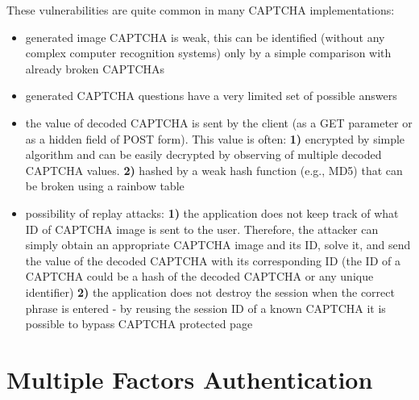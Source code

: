 	These vulnerabilities are quite common in many CAPTCHA implementations:
	\begin{itemize}
		\item generated image CAPTCHA is weak, this can be identified (without any complex computer
		recognition systems) only by a simple comparison with already broken CAPTCHAs
		\item generated CAPTCHA questions have a very limited set of possible answers
		\item the value of decoded CAPTCHA is sent by the client (as a GET parameter or as a 
		hidden field of POST form). This value is often: {\bf 1)} encrypted by simple algorithm and 
		can be easily decrypted by observing of multiple decoded CAPTCHA values. 
		{\bf 2)} hashed by a weak hash function (e.g., MD5) that can be broken using a rainbow 
		table 
		\item possibility of replay attacks:
			{\bf 1)} the application does not keep track of what ID of CAPTCHA image is sent to 
			the user. Therefore, the attacker can simply obtain an appropriate CAPTCHA image and 
			its ID, solve it, and send the value of the decoded CAPTCHA with its corresponding ID 
			(the ID of a CAPTCHA could be a hash of the decoded CAPTCHA or any unique identifier)
			{\bf 2)} the application does not destroy the session when the correct phrase is entered 
			- by reusing the session ID of a known CAPTCHA it is possible to bypass CAPTCHA protected 
			page
	\end{itemize}


\section{Multiple Factors Authentication}

